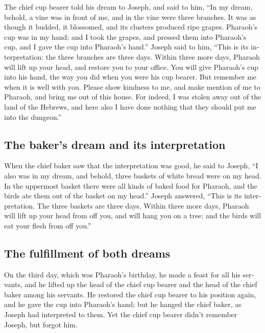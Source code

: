 \begin{paracol}{2}
\begin{otherlanguage}{english}
 The chief cup bearer told his dream to Joseph, and said
to him, ``In my dream, behold, a vine was in front of me,
 and in the vine were three branches. It was as though it
budded, it blossomed, and its clusters produced ripe grapes.
 Pharaoh's cup was in my hand; and I took the grapes, and
pressed them into Pharaoh's cup, and I gave the cup into Pharaoh's
hand.''  Joseph said to him, ``This is its
interpretation: the three branches are three days. 
Within three more days, Pharaoh will lift up your head, and restore you
to your office. You will give Pharaoh's cup into his hand, the way you
did when you were his cup bearer.  But remember me when
it is well with you. Please show kindness to me, and make mention of me
to Pharaoh, and bring me out of this house.  For indeed,
I was stolen away out of the land of the Hebrews, and here also I have
done nothing that they should put me into the dungeon.''

\hypertarget{the-bakers-dream-and-its-interpretation}{%
\subsection{The baker's dream and its
interpretation}\label{the-bakers-dream-and-its-interpretation}}

 When the chief baker saw that the interpretation was
good, he said to Joseph, ``I also was in my dream, and behold, three
baskets of white bread were on my head.  In the uppermost
basket there were all kinds of baked food for Pharaoh, and the birds ate
them out of the basket on my head.''  Joseph answered,
``This is its interpretation. The three baskets are three days.
 Within three more days, Pharaoh will lift up your head
from off you, and will hang you on a tree; and the birds will eat your
flesh from off you.''

\hypertarget{the-fulfillment-of-both-dreams}{%
\subsection{The fulfillment of both
dreams}\label{the-fulfillment-of-both-dreams}}

 On the third day, which was Pharaoh's birthday, he made
a feast for all his servants, and he lifted up the head of the chief cup
bearer and the head of the chief baker among his servants.
 He restored the chief cup bearer to his position again,
and he gave the cup into Pharaoh's hand;  but he hanged
the chief baker, as Joseph had interpreted to them.  Yet
the chief cup bearer didn't remember Joseph, but forgot him.


\end{otherlanguage}
\end{paracol}
